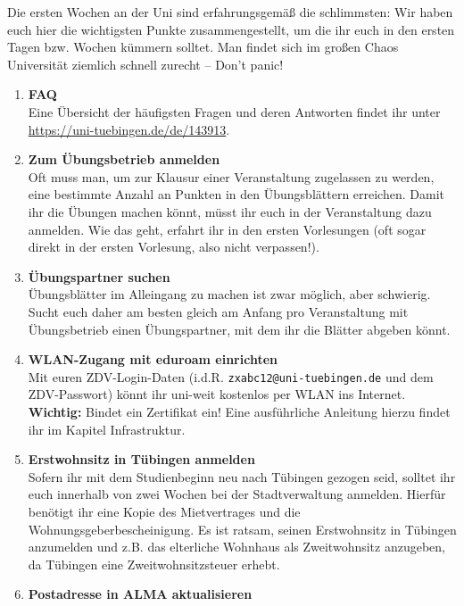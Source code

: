 
Die ersten Wochen an der Uni sind erfahrungsgemäß die schlimmsten: Wir haben euch hier die wichtigsten Punkte zusammengestellt, um die ihr euch in den ersten Tagen bzw. Wochen kümmern solltet. Man findet sich im großen Chaos Universität ziemlich schnell zurecht -- Don't panic!
  
  \begin{enumerate}[label=$\bigcirc$]
  	
  	\item \textbf{FAQ} \\
		Eine Übersicht der häufigsten Fragen und deren Antworten findet
                ihr unter \mbox{\url{https://uni-tuebingen.de/de/143913}}.	%
	\item \textbf{Zum Übungsbetrieb anmelden} \\
	  	Oft muss man, um zur Klausur einer Veranstaltung zugelassen zu werden, eine bestimmte Anzahl an Punkten in den Übungsblättern erreichen. Damit ihr die Übungen machen könnt, müsst ihr euch in der Veranstaltung dazu anmelden. Wie das geht, erfahrt ihr in den ersten Vorlesungen (oft sogar direkt in der ersten Vorlesung, also nicht verpassen!).
  	\item \textbf{Übungspartner suchen} \\
	  	Übungsblätter im Alleingang zu machen ist zwar möglich, aber schwierig. Sucht euch daher am besten gleich am Anfang pro Veranstaltung mit Übungsbetrieb einen Übungspartner, mit dem ihr die Blätter abgeben könnt.
  	\item \textbf{WLAN-Zugang mit eduroam einrichten}\\
	  	Mit euren ZDV-Login-Daten (i.d.R. \texttt{zxabc12@uni-tuebingen.de} und dem ZDV-Passwort) könnt ihr uni-weit kostenlos per WLAN ins Internet. \textbf{Wichtig:} Bindet ein Zertifikat ein! Eine ausführliche Anleitung hierzu findet ihr im Kapitel Infrastruktur.
  	\item \textbf{Erstwohnsitz in Tübingen anmelden} \\
	  	Sofern ihr mit dem Studienbeginn neu nach Tübingen gezogen seid, solltet ihr euch innerhalb von zwei Wochen bei der Stadtverwaltung anmelden. Hierfür benötigt ihr eine Kopie des Mietvertrages und die Wohnungsgeberbescheinigung. Es ist ratsam, seinen Erstwohnsitz in Tübingen anzumelden und z.B. das elterliche Wohnhaus als Zweitwohnsitz anzugeben, da Tübingen eine Zweitwohnsitzsteuer erhebt.
	\item \textbf{Postadresse in ALMA aktualisieren}\\

\end{enumerate}
